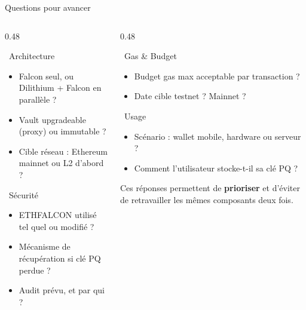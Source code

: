 \documentclass[aspectratio=169, 12pt]{beamer}
\begin{document}
\begin{frame}[shrink=8]{Questions pour avancer}
  \begin{columns}[T]
    \begin{column}{0.48\textwidth}
      \begin{block}{\faCog\ Architecture}
        \small\begin{itemize}\setlength\itemsep{1pt}
          \item Falcon seul, ou Dilithium + Falcon en parallèle ?
          \item Vault upgradeable (proxy) ou immutable ?
          \item Cible réseau : Ethereum mainnet ou L2 d'abord ?
        \end{itemize}
      \end{block}
      \vspace{0.1cm}
      \begin{block}{\faShieldAlt\ Sécurité}
        \small\begin{itemize}\setlength\itemsep{1pt}
          \item ETHFALCON utilisé tel quel ou modifié ?
          \item Mécanisme de récupération si clé PQ perdue ?
          \item Audit prévu, et par qui ?
        \end{itemize}
      \end{block}
    \end{column}
    \begin{column}{0.48\textwidth}
      \begin{block}{\faGasPump\ Gas \& Budget}
        \small\begin{itemize}\setlength\itemsep{1pt}
          \item Budget gas max acceptable par transaction ?
          \item Date cible testnet ? Mainnet ?
        \end{itemize}
      \end{block}
      \vspace{0.1cm}
      \begin{block}{\faUsers\ Usage}
        \small\begin{itemize}\setlength\itemsep{1pt}
          \item Scénario : wallet mobile, hardware ou serveur ?
          \item Comment l'utilisateur stocke-t-il sa clé PQ ?
        \end{itemize}
      \end{block}
      \vspace{0.1cm}
      \begin{tcolorbox}[colback=suva_blue!8, colframe=suva_blue,
        top=3pt, bottom=3pt]
        {\small Ces réponses permettent de \textbf{prioriser} et d'éviter de retravailler
        les mêmes composants deux fois.}
      \end{tcolorbox}
    \end{column}
  \end{columns}


\end{frame}
\end{document}
